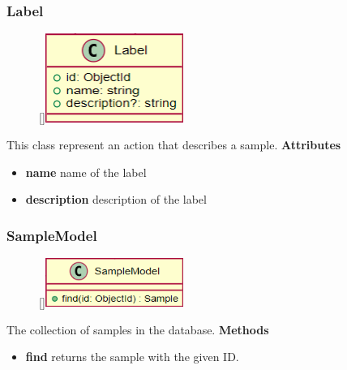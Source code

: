 \subsubsection{Label}
\begin{figure}
    \raisebox{0pt}[\dimexpr{}\baselineskip\relax]{\includegraphics[width=4.5cm]{classes/workspace-management/5.png}}
\end{figure} 
\par
This class represent an action that describes a sample.
\newline
\newline
\textbf{Attributes}
\begin{itemize}
    \item \textbf{name} name of the label
    \item \textbf{description} description of the label
\end{itemize}

\subsubsection{SampleModel}
\begin{figure}
    \raisebox{0pt}[\dimexpr{}\baselineskip\relax]{\includegraphics[width=4.5cm]{classes/workspace-management/6.png}}
\end{figure} 
\par
The collection of samples in the database.
\newline
\newline
\textbf{Methods}
\begin{itemize}
    \item \textbf{find} returns the sample with the given ID.
\end{itemize}

